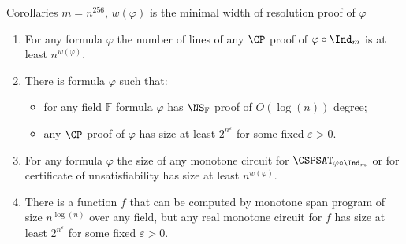 \begin{frame}{Corollaries}
    $m = n^{256}$, $w(\varphi)$ is the minimal width of resolution proof of $\varphi$

    \pause
    \begin{enumerate}
        \item For any formula $\varphi$ the number of lines of any $\CP$ proof of $\varphi \circ \Ind_m$
            is at least $n^{w(\varphi)}$.
        \pause
        \item There is formula $\varphi$ such that:
            \begin{itemize}
                \item for any field $\mathbb{F}$ formula $\varphi$ has $\NS_{\mathbb{F}}$ proof of
                    $O(\log(n))$ degree;
                \item any $\CP$ proof of $\varphi$ has size at least $2^{n^{\varepsilon}}$ for some fixed
                    $\varepsilon > 0$.
            \end{itemize}
        \pause
        \item For any formula $\varphi$ the size of any monotone circuit for $\CSPSAT_{\varphi \circ
            \Ind_m}$ or for certificate of unsatisfiability has size at least $n^{w(\varphi)}$.
        \pause
        \item There is a function $f$ that can be computed by monotone span program of size $n^{\log(n)}$
            over any field, but any real monotone circuit for $f$ has size at least $2^{n^{\varepsilon}}$
            for some fixed $\varepsilon > 0$.
    \end{enumerate}
\end{frame}


